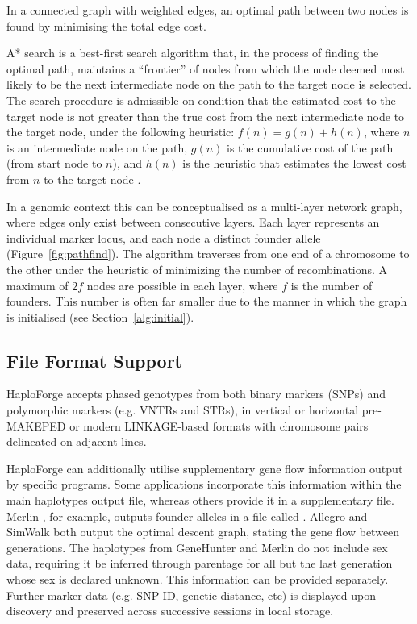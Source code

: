 \documentclass{bioinfo}
\numberwithin{equation}{section}
\def\haplo{{HaploForge}}
\begin{document}
In a connected graph with weighted edges, an optimal path between two nodes is found by minimising the total edge cost. 

A* search is a best-first search algorithm that, in the process of finding the optimal path, maintains a ``frontier'' of nodes from which the node deemed most likely to be the next intermediate node on the path to the target node is selected. The search procedure is admissible on condition that the estimated cost to the target node is not greater than the true cost from the next intermediate node to the target node, under the following heuristic: $f(n) = g(n) + h(n)$, where $n$ is an intermediate node on the path, $g(n)$ is the cumulative cost of the path (from start node to $n$), and $h(n)$ is the heuristic that estimates the lowest cost from $n$ to the target node \citep{astar}.

In a genomic context this can be conceptualised as a multi-layer network graph, where edges only exist between consecutive layers. Each layer represents an individual marker locus, and each node a distinct founder allele (Figure~\ref{fig:pathfind}). The algorithm traverses from one end of a chromosome to the other under the heuristic of minimizing the number of recombinations. A maximum of $2f$ nodes are possible in each layer, where $f$ is the number of founders. This number is often far smaller due to the manner in which the graph is initialised (see Section~\ref{alg:initial}).

\subsection{File Format Support}\label{fileformat}

\haplo{} accepts phased genotypes from both binary markers (SNPs) and polymorphic markers (e.g. VNTRs and STRs), in vertical or horizontal pre-MAKEPED or modern LINKAGE-based formats with chromosome pairs delineated on adjacent lines. 

\haplo{} can additionally utilise supplementary gene flow information output by specific programs. Some applications incorporate this information within the main haplotypes output file, whereas others provide it in a supplementary file. Merlin \citep{merlin}, for example, outputs founder alleles in a file called . Allegro \citep{allegro} and SimWalk \citep{simwalk} both output the optimal descent graph, stating the gene flow between generations. The haplotypes from GeneHunter \citep{kruglyak1996} and Merlin do not include sex data, requiring it be inferred through parentage for all but the last generation whose sex is declared unknown. This information can be provided separately. Further marker data (e.g. SNP ID, genetic distance, etc) is displayed upon discovery and preserved across successive sessions in local storage.
\end{document}
